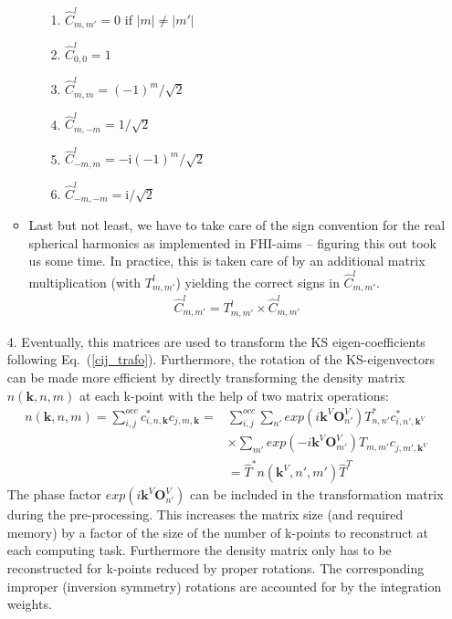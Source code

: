 \begin{enumerate}
\begin{itemize}
 \begin{enumerate}
  \item[1.] $\hat{C}^l_{m,m'}=0$ if $|m|\neq|m'|$
  \item[2.] $\hat{C}^l_{0,0}=1$
  \item[3.] $\hat{C}^l_{m,m}=(-1)^m/\sqrt{2}$
  \item[4.] $\hat{C}^l_{m,-m}=1/\sqrt{2}$
  \item[5.] $\hat{C}^l_{-m,m}=-\text{i}(-1)^m/\sqrt{2}$
  \item[6.] $\hat{C}^l_{-m,-m}=\text{i}/\sqrt{2}$
 \end{enumerate}
 \item Last but not least, we have to take care of the sign convention for the real spherical harmonics as implemented in FHI-aims -- figuring this out took us some time. In practice, this is taken care of by an additional matrix multiplication (with  $T^l_{m,m'}$) yielding the correct signs in $\hat{C}^l_{m,m'}$.
 \begin{align*}
  \hat{C}^l_{m,m'}= T^l_{m,m'}\times \hat{C}^l_{m,m'}
 \end{align*}
\end{itemize}
\item[4.] Eventually, this matrices are used to transform the KS eigen-coefficients following Eq.~(\ref{cij_trafo}).
Furthermore, the rotation of the KS-eigenvectors can be made more efficient 
by directly transforming the density matrix $n(\mathbf{k},n,m)$ at each k-point with the help of two 
matrix operations:
\begin{align}
\label{mm_reconstruction}
 n(\mathbf{k},n,m)=\sum_{i,j}^{occ}c^*_{i,n,\mathbf{k}}c_{j,m,\mathbf{k}}=&\sum_{i,j}^{occ}\sum_{n'}exp(i\mathbf{k}^{V}\mathbf{O}_{n'}^V)T^*_{n,n'}c^*_{i,n',\mathbf{k}^V}\\
 &\times \sum_{m'}exp(-i\mathbf{k}^{V}\mathbf{O}_{m'}^V)T_{m,m'}c_{j,m',\mathbf{k}^V}\nonumber\\
 &=\hat{T}^* n(\mathbf{k}^V,n',m') \hat{T}^T\nonumber
\end{align}
The phase factor $exp(i\mathbf{k}^{V}\mathbf{O}_{n'}^V)$ can be included in the transformation matrix during the pre-processing. This increases the matrix size (and required memory) by a factor of the size of the number of k-points to reconstruct at each computing task. Furthermore the density matrix only has to be reconstructed for k-points reduced by proper rotations. The corresponding improper (inversion symmetry) rotations are accounted for by the integration weights.
\end{enumerate}
\newpage


